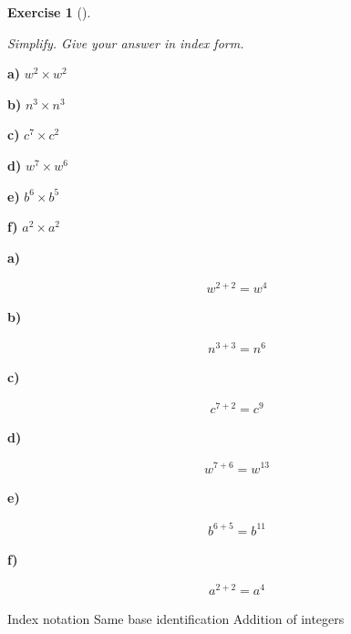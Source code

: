 \documentclass[
  letterpaper,
  DIV=11,
  numbers=noendperiod]{scrreprt}
\theoremstyle{definition}
\newtheorem{exercise}{Exercise}[chapter]
\theoremstyle{remark}
\begin{document}
\begin{exercise}[]\protect\hypertarget{exr-u2-1}{}\label{exr-u2-1}

\emph{Simplify. Give your answer in index form.}

\textbf{a)} \(\displaystyle w^{2} \times w^{2}\)

\textbf{b)} \(\displaystyle n^{3} \times n^{3}\)

\textbf{c)} \(\displaystyle c^{7} \times c^{2}\)

\textbf{d)} \(\displaystyle w^{7} \times w^{6}\)

\textbf{e)} \(\displaystyle b^{6} \times b^{5}\)

\textbf{f)} \(\displaystyle a^{2} \times a^{2}\)

\begin{tcolorbox}[enhanced jigsaw, opacitybacktitle=0.6, coltitle=black, arc=.35mm, colframe=quarto-callout-tip-color-frame, colback=white, bottomrule=.15mm, left=2mm, colbacktitle=quarto-callout-tip-color!10!white, titlerule=0mm, opacityback=0, title=\textcolor{quarto-callout-tip-color}{\faLightbulb}\hspace{0.5em}{🔍 View Solutions}, leftrule=.75mm, breakable, rightrule=.15mm, bottomtitle=1mm, toptitle=1mm, toprule=.15mm]

\textbf{a)}

\[
\begin{aligned}
w^{2+2} = w^{4}
\end{aligned}
\]

\textbf{b)}

\[
\begin{aligned}
n^{3+3} = n^{6}
\end{aligned}
\]

\textbf{c)}

\[
\begin{aligned}
c^{7+2} = c^{9}
\end{aligned}
\]

\textbf{d)}

\[
\begin{aligned}
w^{7+6} = w^{13}
\end{aligned}
\]

\textbf{e)}

\[
\begin{aligned}
b^{6+5} = b^{11}
\end{aligned}
\]

\textbf{f)}

\[
\begin{aligned}
a^{2+2} = a^{4}
\end{aligned}
\]

\end{tcolorbox}

{Index notation} {Same base identification} {Addition of integers}

\end{exercise}
\end{document}
